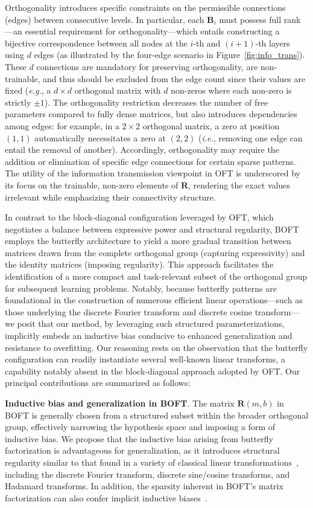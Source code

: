 Orthogonality introduces specific constraints on the permissible connections (edges) between consecutive levels. In particular, each $\bm{B}_i$ must possess full rank—an essential requirement for orthogonality—which entails constructing a bijective correspondence between all nodes at the $i$-th and $(i+1)$-th layers using $d$ edges (as illustrated by the four-edge scenario in Figure~\ref{fig:info_trans}). These $d$ connections are mandatory for preserving orthogonality, are non-trainable, and thus should be excluded from the edge count since their values are fixed (\emph{e.g.}, a $d\times d$ orthogonal matrix with $d$ non-zeros where each non-zero is strictly $\pm 1$). The orthogonality restriction decreases the number of free parameters compared to fully dense matrices, but also introduces dependencies among edges: for example, in a $2\times 2$ orthogonal matrix, a zero at position $(1,1)$ automatically necessitates a zero at $(2,2)$ (\emph{i.e.}, removing one edge can entail the removal of another). Accordingly, orthogonality may require the addition or elimination of specific edge connections for certain sparse patterns. The utility of the information transmission viewpoint in OFT is underscored by its focus on the trainable, non-zero elements of $\bm{R}$, rendering the exact values irrelevant while emphasizing their connectivity structure.

In contrast to the block-diagonal configuration leveraged by OFT, which negotiates a balance between expressive power and structural regularity, BOFT employs the butterfly architecture to yield a more gradual transition between matrices drawn from the complete orthogonal group (capturing expressivity) and the identity matrices (imposing regularity). This approach facilitates the identification of a more compact and task-relevant subset of the orthogonal group for subsequent learning problems. Notably, because butterfly patterns are foundational in the construction of numerous efficient linear operations—such as those underlying the discrete Fourier transform and discrete cosine transform—we posit that our method, by leveraging such structured parameterizations, implicitly embeds an inductive bias conducive to enhanced generalization and resistance to overfitting. Our reasoning rests on the observation that the butterfly configuration can readily instantiate several well-known linear transforms, a capability notably absent in the block-diagonal approach adopted by OFT. Our principal contributions are summarized as follows:

\textbf{Inductive bias and generalization in BOFT}. The matrix $\bm{R}(m,b)$ in BOFT is generally chosen from a structured subset within the broader orthogonal group, effectively narrowing the hypothesis space and imposing a form of inductive bias. We propose that the inductive bias arising from butterfly factorization is advantageous for generalization, as it introduces structural regularity similar to that found in a variety of classical linear transformations~\cite{dao2019kaleidoscope}, including the discrete Fourier transform, discrete sine/cosine transforms, and Hadamard transforms. In addition, the sparsity inherent in BOFT’s matrix factorization can also confer implicit inductive biases~\cite{gunasekar2017implicit,li2018algorithmic,liu2019neural}.

